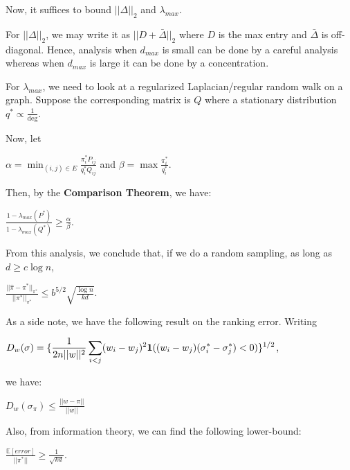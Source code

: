 \documentclass[letterpaper, 11pt, reqno]{amsart}
\begin{document}
	Now, it suffices to bound $\vert\vert \Delta \vert\vert_2$ and $\lambda_{max}$.
	
	For $\vert\vert \Delta \vert\vert_2$, we may write it as $\vert\vert D + \bar{\Delta} \vert\vert_2$ where $D$ is the max entry and $\bar{\Delta}$ is off-diagonal. Hence, analysis when $d_{max}$ is small can be done by a careful analysis whereas when $d_{max}$ is large it can be done by a concentration.
	
	
	For $\lambda_{max}$, we need to look at a regularized Laplacian/regular random walk on a graph. Suppose the corresponding matrix is $Q$ where a stationary distribution $q^* \propto \frac{1}{\deg}$.
	
	Now, let
		\begin{center}
			$\displaystyle \alpha = \min_{(i, j) \in E} \frac{\pi_i^* P_{ij}}{q_i^* Q_{ij}}$ and $\displaystyle \beta = \max \frac{\pi_i^*}{q_i^*}$.
		\end{center}
	Then, by the {\bf Comparison Theorem}, we have:
		\begin{center}
			$\displaystyle \frac{1 - \lambda_{max}(P^*)}{1-\lambda_{max}(Q^*)} \geq \frac{\alpha}{\beta}$.
		\end{center}
	
	From this analysis, we conclude that, if we do a random sampling, as long as $d \geq c \log n$,
		\begin{center}
			$\displaystyle \frac{\vert\vert \hat{\pi} - \pi^* \vert\vert_{\pi^*}}{\vert\vert \pi^* \vert\vert_{\pi^*}} \leq b^{5/2} \sqrt{\frac{\log n}{kd}}$.
		\end{center}
	
	As a side note, we have the following result on the ranking error. Writing
		\begin{center}
			$\displaystyle D_w (\sigma) = \{ \frac{1}{2 n \vert\vert w \vert\vert^2} \sum_{i<j} (w_i -w_j)^2 {\bf 1} ((w_i - w_j)(\sigma_i^* - \sigma_j^*) < 0) \}^{1/2}$,
		\end{center}
	
	we have:
		\begin{center}
			$\displaystyle D_w (\sigma_{\pi}) \leq \frac{\vert\vert w - \pi \vert\vert}{\vert\vert w \vert\vert}$
		\end{center}
	
	Also, from information theory, we can find the following lower-bound:
		\begin{center}
			$\displaystyle \frac{\mathbb{E}[error]}{\vert\vert \pi^* \vert\vert} \geq \frac{1}{\sqrt{kd}}$.
		\end{center}
		
\end{document}
